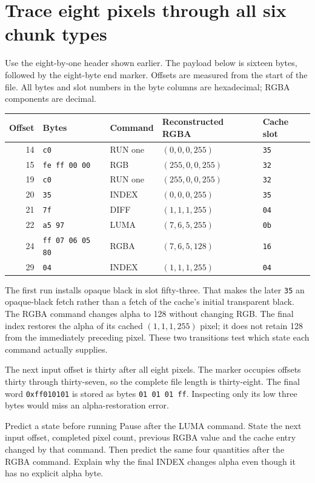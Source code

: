 \section{Trace eight pixels through all six chunk types}
Use the eight-by-one header shown earlier. The payload below is sixteen bytes, followed
by the eight-byte end marker. Offsets are measured from the start of the file. All
bytes and slot numbers in the byte columns are hexadecimal; RGBA components are decimal.

\begin{center}
  \small
  \begin{tabular}{rllll}
    Offset & Bytes                   & Command & Reconstructed RGBA & Cache slot  \\
    \hline
    14     & \texttt{c0}             & RUN one & \((0,0,0,255)\)    & \texttt{35} \\
    15     & \texttt{fe ff 00 00}    & RGB     & \((255,0,0,255)\)  & \texttt{32} \\
    19     & \texttt{c0}             & RUN one & \((255,0,0,255)\)  & \texttt{32} \\
    20     & \texttt{35}             & INDEX   & \((0,0,0,255)\)    & \texttt{35} \\
    21     & \texttt{7f}             & DIFF    & \((1,1,1,255)\)    & \texttt{04} \\
    22     & \texttt{a5 97}          & LUMA    & \((7,6,5,255)\)    & \texttt{0b} \\
    24     & \texttt{ff 07 06 05 80} & RGBA    & \((7,6,5,128)\)    & \texttt{16} \\
    29     & \texttt{04}             & INDEX   & \((1,1,1,255)\)    & \texttt{04} \\
  \end{tabular}
\end{center}

The first run installs opaque black in slot fifty-three. That makes the later
\texttt{35} an opaque-black fetch rather than a fetch of the cache's initial transparent
black. The RGBA command changes alpha to 128 without changing RGB. The final index
restores the alpha of its cached \((1,1,1,255)\) pixel; it does not retain 128 from
the immediately preceding pixel. These two transitions test which state each command
actually supplies.

The next input offset is thirty after all eight pixels. The marker occupies offsets
thirty through thirty-seven, so the complete file length is thirty-eight. The final
word \texttt{0xff010101} is stored as bytes \texttt{01 01 01 ff}. Inspecting only
its low three bytes would miss an alpha-restoration error.

\begin{MARSExercise}{Predict a state before running}
  Pause after the LUMA command. State the next input offset, completed pixel count,
  previous RGBA value and the cache entry changed by that command. Then predict the
  same four quantities after the RGBA command. Explain why the final INDEX changes
  alpha even though it has no explicit alpha byte.
\end{MARSExercise}
